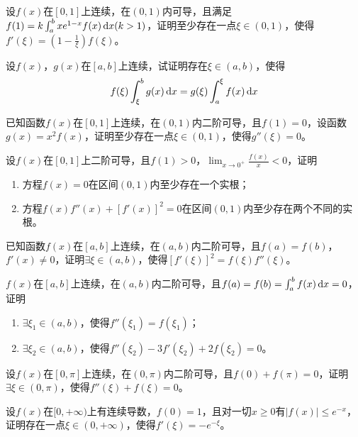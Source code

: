 \begin{example}
	设$f(x)$在$[0,1]$上连续，在$(0,1)$内可导，且满足$f(1)=k\int_{a}^{b}xe^{1-x}f(x)\,\mathrm{d} x(k>1)$，证明至少存在一点$\xi\in(0,1)$，使得$f'(\xi)=(1-\frac{1}{\xi})f(\xi)$。
\end{example}

\begin{example}
	设$f(x)$，$g(x)$在$[a,b]$上连续，试证明存在$\xi\in(a,b)$，使得\[f(\xi)\int_{\xi}^{b}g(x)\,\mathrm{d} x=g(\xi)\int_{a}^{\xi}f(x)\,\mathrm{d} x\]
\end{example}

\begin{example}
	已知函数$f(x)$在$[0,1]$上连续，在$(0,1)$内二阶可导，且$f(1)=0$，设函数$g(x)=x^2f(x)$，证明至少存在一点$\xi\in(0,1)$，使得$g''(\xi)=0$。
\end{example}

\begin{example}
	设$f(x)$在$[0,1]$上二阶可导，且$f(1)>0$，$\lim_{x\to 0^+}\frac{f(x)}{x}<0$，证明
	\begin{enumerate}
		\item 方程$f(x)=0$在区间$(0,1)$内至少存在一个实根；
		\item 方程$f(x)f''(x)+[f'(x)]^2=0$在区间$(0,1)$内至少存在两个不同的实根。
	\end{enumerate}
\end{example}

\begin{example}
	已知函数$f(x)$在$[a,b]$上连续，在$(a,b)$内二阶可导，且$f(a)=f(b)$，$f'(x)\neq 0$，证明$\exists\xi\in(a,b)$，使得$[f'(\xi)]^2=f(\xi)f''(\xi)$。
\end{example}

\begin{example}
	$f(x)$在$[a,b]$上连续，在$(a,b)$内二阶可导，且$f(a)=f(b)=\int_{a}^{b}f(x)\,\mathrm{d} x=0$，证明
	\begin{enumerate}
		\item $\exists\xi_1\in(a,b)$，使得$f''(\xi_1)=f(\xi_1)$；
		\item $\exists\xi_2\in(a,b)$，使得$f''(\xi_2)-3f'(\xi_2)+2f(\xi_2)=0$。
	\end{enumerate}
\end{example}

\begin{example}
	设$f(x)$在$[0,\pi]$上连续，在$(0,\pi)$内二阶可导，且$f(0)+f(\pi)=0$，证明$\exists\xi\in(0,\pi)$，使得$f''(\xi)+f(\xi)=0$。
\end{example}

\begin{example}
	设$f(x)$在$[0,+\infty)$上有连续导数，$f(0)=1$，且对一切$x\geqslant0$有$|f(x)|\leqslant e^{-x}$，证明存在一点$\xi\in(0,+\infty)$，使得$f'(\xi)=-e^{-\xi}$。
\end{example}

